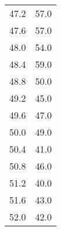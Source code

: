 \begin{longtable}{S[table-format=3.1] S[table-format=3.0]}
                47.2 & 57.0\\
                47.6 & 57.0\\
                48.0 & 54.0\\
                48.4 & 59.0\\
                48.8 & 50.0\\
                49.2 & 45.0\\
                49.6 & 47.0\\
                50.0 & 49.0\\
                50.4 & 41.0\\
                50.8 & 46.0\\
                51.2 & 40.0\\
                51.6 & 43.0\\
                52.0 & 42.0\\
                \bottomrule
\end{longtable}
